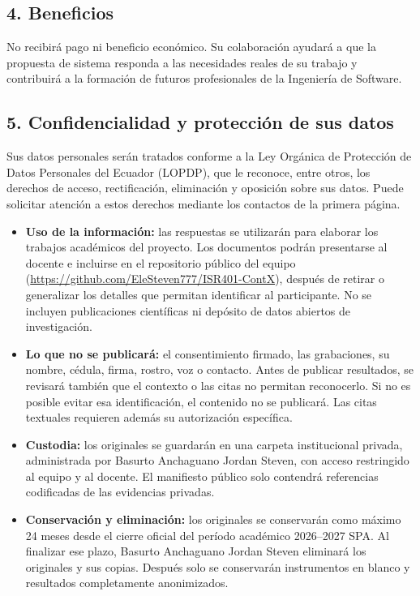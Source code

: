 \subsection*{4. Beneficios}
No recibir\'a pago ni beneficio econ\'omico. Su colaboraci\'on ayudar\'a a que la propuesta de
sistema responda a las necesidades reales de su trabajo y contribuir\'a a la formaci\'on de futuros
profesionales de la Ingenier\'ia de Software.

\subsection*{5. Confidencialidad y protecci\'on de sus datos}
Sus datos personales ser\'an tratados conforme a la Ley Org\'anica de Protecci\'on de Datos
Personales del Ecuador (LOPDP), que le reconoce, entre otros, los derechos de acceso,
rectificaci\'on, eliminaci\'on y oposici\'on sobre sus datos. Puede solicitar atenci\'on a estos
derechos mediante los contactos de la primera p\'agina.
\begin{itemize}[nosep]
  \item \textbf{Uso de la informaci\'on:} las respuestas se utilizar\'an para elaborar los trabajos
        acad\'emicos del proyecto. Los documentos podr\'an presentarse al docente e incluirse en el
        repositorio p\'ublico del equipo (\url{https://github.com/EleSteven777/ISR401-ContX}),
        despu\'es de retirar o generalizar los detalles que permitan identificar al participante.
        No se incluyen publicaciones cient\'ificas ni dep\'osito de datos abiertos de investigaci\'on.
  \item \textbf{Lo que no se publicar\'a:} el consentimiento firmado, las grabaciones, su nombre,
        c\'edula, firma, rostro, voz o contacto. Antes de publicar resultados, se revisar\'a tambi\'en
        que el contexto o las citas no permitan reconocerlo. Si no es posible evitar esa
        identificaci\'on, el contenido no se publicar\'a. Las citas textuales requieren adem\'as su
        autorizaci\'on espec\'ifica.
  \item \textbf{Custodia:} los originales se guardar\'an en una carpeta institucional privada,
        administrada por Basurto Anchaguano Jordan Steven, con acceso restringido al equipo y al
        docente. El manifiesto p\'ublico solo contendr\'a referencias codificadas de las evidencias
        privadas.
  \item \textbf{Conservaci\'on y eliminaci\'on:} los originales se conservar\'an como m\'aximo 24
        meses desde el cierre oficial del per\'iodo acad\'emico 2026--2027 SPA. Al finalizar ese
        plazo, Basurto Anchaguano Jordan Steven eliminar\'a los originales y sus copias. Despu\'es
        solo se conservar\'an instrumentos en blanco y resultados completamente anonimizados.
\end{itemize}

